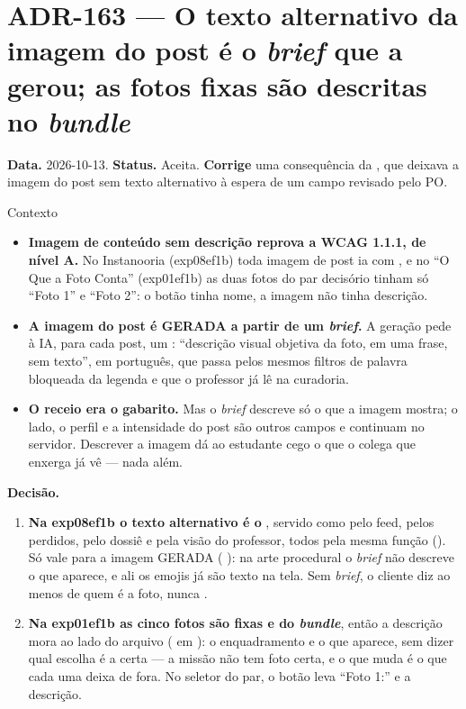 \section{ADR-163 --- O texto alternativo da imagem do post é o \emph{brief} que a gerou; as fotos fixas são descritas no \emph{bundle}}
\label{adr:texto-alternativo}

\textbf{Data.} 2026-10-13. \textbf{Status.} Aceita. \textbf{Corrige} uma
consequência da , que deixava a imagem do post sem texto
alternativo à espera de um campo revisado pelo PO.

\begin{especificacao}{Contexto}
\begin{itemize}
  \item \textbf{Imagem de conteúdo sem descrição reprova a WCAG 1.1.1, de nível
    A.} No Instanooria (exp08ef1b) toda imagem de post ia com , e no
    \enquote{O Que a Foto Conta} (exp01ef1b) as duas fotos do par decisório
    tinham só \enquote{Foto 1} e \enquote{Foto 2}: o botão tinha nome, a imagem
    não tinha descrição.
  \item \textbf{A imagem do post é GERADA a partir de um \emph{brief}.} A
    geração pede à IA, para cada post, um : \enquote{descrição
    visual objetiva da foto, em uma frase, sem texto}, em português, que passa
    pelos mesmos filtros de palavra bloqueada da legenda e que o professor já
    lê na curadoria.
  \item \textbf{O receio era o gabarito.} Mas o \emph{brief} descreve só o que a
    imagem mostra; o lado, o perfil e a intensidade do post são outros campos e
    continuam no servidor. Descrever a imagem dá ao estudante cego o que o
    colega que enxerga já vê --- nada além.
\end{itemize}
\end{especificacao}

\textbf{Decisão.}

\begin{enumerate}
  \item \textbf{Na exp08ef1b o texto alternativo é o }, servido
    como  pelo feed, pelos perdidos, pelo dossiê e pela visão do
    professor, todos pela mesma função
    (). Só vale para a
    imagem GERADA ( ): na arte procedural o \emph{brief}
    não descreve o que aparece, e ali os emojis já são texto na tela. Sem
    \emph{brief}, o cliente diz ao menos de quem é a foto, nunca .
  \item \textbf{Na exp01ef1b as cinco fotos são fixas e do \emph{bundle}}, então
    a descrição mora ao lado do arquivo ( em
    ): o enquadramento e o que aparece, sem dizer
    qual escolha é a certa --- a missão não tem foto certa, e o que muda é o que
    cada uma deixa de fora. No seletor do par, o botão leva \enquote{Foto 1:} e
    a descrição.
\end{enumerate}

